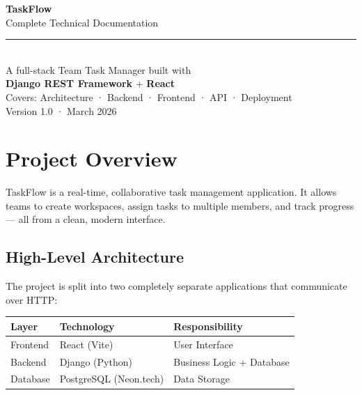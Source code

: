 \documentclass[12pt,a4paper]{article}
\begin{document}

\begin{titlepage}
    \centering
    \vspace*{3cm}
    {\Huge\bfseries\color{primaryblue} TaskFlow}\\[0.5em]
    {\Large\color{textgray} Complete Technical Documentation}\\[2em]
    \noindent\rule{\linewidth}{0.5pt}\\[2em]
    {\large A full-stack Team Task Manager built with\\[0.3em]
    \textbf{Django REST Framework} + \textbf{React}}\\[3em]
    {\color{textgray} Covers: Architecture · Backend · Frontend · API · Deployment}\\[1em]
    {\small\color{textgray} Version 1.0 · March 2026}
    \vfill
\end{titlepage}

\tableofcontents
\newpage


\section{Project Overview}

TaskFlow is a real-time, collaborative task management application. It allows teams to create workspaces, assign tasks to multiple members, and track progress — all from a clean, modern interface.

\subsection{High-Level Architecture}

The project is split into two completely separate applications that communicate over HTTP:

\begin{center}
\begin{tabular}{lll}
\toprule
\textbf{Layer} & \textbf{Technology} & \textbf{Responsibility} \\
\midrule
Frontend & React (Vite) & User Interface \\
Backend & Django (Python) & Business Logic + Database \\
Database & PostgreSQL (Neon.tech) & Data Storage \\
\bottomrule
\end{tabular}
\end{center}
\end{document}
